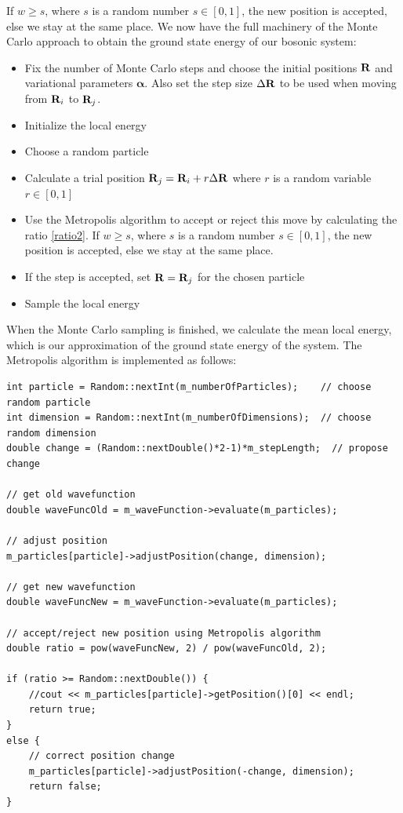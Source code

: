 \documentclass[english, a4paper]{article}
\begin{document}
If $w \geq s$, where $s$ is a random number $s \in [0,1]$, the new position is accepted, else we stay
at the same place.
We now have the full machinery of the Monte Carlo approach to obtain the ground state energy of our bosonic system:
\begin{itemize}
 \item Fix the number of Monte Carlo steps and choose the initial positions ${\bf R}$
       and variational parameters $\boldsymbol{\alpha}$.
       Also set the step size $\Delta {\bf R}$ to be used when moving from ${\bf R}_i$ to ${\bf R}_j$.
 \item Initialize the local energy
 \item Choose a random particle
 \item Calculate a trial position ${\bf R}_j = {\bf R}_i + r  \Delta {\bf R}$ where $r$ is a random variable
       $r \in [0,1]$
 \item Use the Metropolis algorithm to accept or reject this move by calculating the ratio \eqref{ratio2}. 
       If $w \geq s$, where $s$ is a random number $s \in [0,1]$, the new position is accepted, else we stay
       at the same place.
 \item If the step is accepted, set ${\bf R} = {\bf R}_j$ for the chosen particle
 \item Sample the local energy
\end{itemize}
When the Monte Carlo sampling is finished, we calculate the mean local energy, which is our approximation
of the ground state energy of the system.
The Metropolis algorithm is implemented as follows:
\belowcaptionskip=-10pt
\begin{lstlisting}[label=MetropolisBrute,caption=Brute Force Metropolis algorithm]
int particle = Random::nextInt(m_numberOfParticles);    // choose random particle
int dimension = Random::nextInt(m_numberOfDimensions);  // choose random dimension
double change = (Random::nextDouble()*2-1)*m_stepLength;  // propose change

// get old wavefunction
double waveFuncOld = m_waveFunction->evaluate(m_particles);

// adjust position
m_particles[particle]->adjustPosition(change, dimension);

// get new wavefunction
double waveFuncNew = m_waveFunction->evaluate(m_particles);

// accept/reject new position using Metropolis algorithm
double ratio = pow(waveFuncNew, 2) / pow(waveFuncOld, 2);

if (ratio >= Random::nextDouble()) {
    //cout << m_particles[particle]->getPosition()[0] << endl;
    return true;
}
else {
    // correct position change
    m_particles[particle]->adjustPosition(-change, dimension);
    return false;
}
\end{lstlisting}
\end{document}
